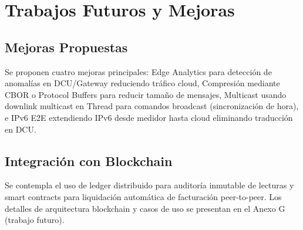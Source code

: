 ﻿\section{Trabajos Futuros y Mejoras}

\subsection{Mejoras Propuestas}

Se proponen cuatro mejoras principales: Edge Analytics para detección de anomalías en DCU/Gateway reduciendo tráfico cloud, Compresión mediante CBOR o Protocol Buffers para reducir tamaño de mensajes, Multicast usando downlink multicast en Thread para comandos broadcast (sincronización de hora), e IPv6 E2E extendiendo IPv6 desde medidor hasta cloud eliminando traducción en DCU.

\subsection{Integración con Blockchain}

Se contempla el uso de ledger distribuido para auditoría inmutable de lecturas y smart contracts para liquidación automática de facturación peer-to-peer. Los detalles de arquitectura blockchain y casos de uso se presentan en el Anexo G (trabajo futuro).

